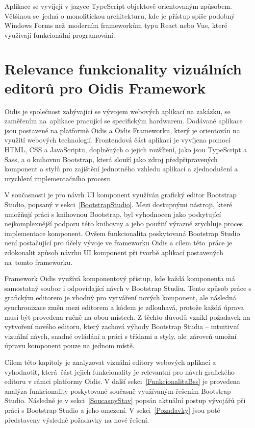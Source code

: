 Aplikace se vyvíjejí v jazyce TypeScript objektově orientovaným způsobem. Většinou se~jedná o monolitickou architekturu, kde je přístup spíše podobný Windows Forms než~moderním frameworkům typu React nebo Vue, které využívají funkcionální programování.

\chapter{Relevance funkcionality vizuálních editorů pro Oidis Framework}
\label{Editory}
Oidis je společnost zabývající se vývojem webových aplikací na zakázku, se zaměřením na~aplikace pracující se specifickým hardwarem. Dodávané aplikace jsou postavené na platformě Oidis a Oidis Frameworku, který je orientován na využití webových technologií. Frontendová část aplikací je vyvíjena pomocí HTML, CSS a JavaScriptu, doplněných o jejich rozšíření, jako jsou TypeScript a Sass, a o knihovnu Bootstrap, která slouží jako zdroj předpřipravených komponent a stylů pro zajištění jednotného vzhledu aplikací a zjednodušení a urychlení implementačního procesu.

V současnosti je pro návrh UI komponent využíván grafický editor Bootstrap Studio, popsaný v sekci~\ref{BootstrapStudio}. Mezi dostupnými nástroji, které umožňují práci s knihovnou Bootstrap, byl vyhodnocen jako poskytující nejkomplexnější podporu této knihovny a jeho použití výrazně zrychluje proces implementace komponent. Ovšem funkcionalita poskytovaná Bootstrap Studio není postačující pro účely vývoje ve frameworku Oidis a cílem této~práce je zdokonalit způsob návrhu UI komponent při tvorbě aplikací postavených na~tomto frameworku.

Framework Oidis využívá komponentový přístup, kde každá komponenta má samostatný soubor i odpovídající návrh v Bootstrap Studiu. Tento způsob práce s grafickým editorem je vhodný pro vytváření nových komponent, ale následná synchronizace změn mezi editorem a kódem je zdlouhavá, protože každá úprava musí být provedena ručně na obou místech. Z těchto důvodů vznikl požadavek na vytvoření nového editoru, který zachová výhody Bootstrap Studia -- intuitivní vizuální návrh, snadné ovládání a práci s třídami a styly, ale~zároveň umožní úpravu komponent pouze na jednom místě.

Cílem této kapitoly je analyzovat vizuální editory webových aplikací a vyhodnotit, která~část jejich funkcionality je relevantní pro návrh grafického editoru v rámci platformy Oidis. V další sekci~\ref{FunkcionalitaBss} je provedena analýza funkcionality poskytované současně využívaným řešením Bootstrap Studio. Následně je v sekci~\ref{SoucasnyStav} popsán aktuální postup vývojářů při práci s Bootstrap Studio a jeho omezení. V sekci~\ref{Pozadavky} jsou poté představeny výsledné požadavky na nové řešení.

